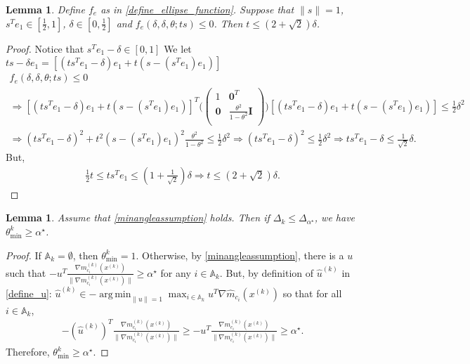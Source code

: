 \documentclass{article}
\newtheorem{lemma}[theorem]{Lemma}
\theoremstyle{case}
\DeclareMathOperator*{\argmin}{arg\,min}
\newcommand{\xk}{{x^{(k)}}}
\newcommand{\dk}{\Delta_k}
\newcommand{\huk}{{{\hat u}^{(k)}}}
\newcommand{\gmcik}{{\nabla m_{c_i}^{(k)}(\xk)}}
\newcommand{\hgmcik}{{\nabla \hat m_{c_i}(\xk)}}
\newcommand{\minangledelta}{{\Delta_{\alpha^{\star}}}}
\newcommand{\minanglealpha}{{ \alpha^{\star} }}
\newcommand{\activeconstraintsk}{{\mathbb A_{k}}}
\newcommand{\thetamink}{{\theta^k_{\text{min}}}}
\begin{document}
\begin{lemma}
\label{ellipse_fits_part_2}
Define $f_e$ as in \cref{define_ellipse_function}.
Suppose that $\|s\| = 1$, $s^Te_1 \in \left[\frac 1 2, 1\right]$, $\delta \in [0, \frac 1 2]$ and $f_e(\delta, \delta, \theta; ts) \le 0$.
Then $t \le \left(2 + \sqrt{2}\right) \delta$.
\end{lemma}
\begin{proof}
Notice that $s^Te_1 - \delta \in \left[0, 1\right]$
We let $ts - \delta e_1= \left[\left(ts^Te_1 - \delta\right) e_1 + t\left(s - \left(s^Te_1\right) e_1\right)\right]$
\begin{align*}
f_e(\delta, \delta, \theta; ts) \le 0 \\
\Longrightarrow 
\left[\left(ts^Te_1 - \delta\right) e_1 + t\left(s - \left(s^Te_1\right) e_1\right)\right]^T\bigg(\begin{pmatrix}
1 & \boldsymbol0^T \\
\boldsymbol 0 & \frac{\theta^2}{1 - \theta^2} \boldsymbol I \\
\end{pmatrix}\bigg)\left[\left(ts^Te_1 - \delta\right) e_1 + t\left(s - \left(s^Te_1\right) e_1\right)\right] \le \frac 1 2 \delta^2 \\
\Longrightarrow
\left(ts^Te_1 - \delta\right)^2 + t^2\left(s - \left(s^Te_1\right) e_1\right)^2  \frac{\theta^2}{1 - \theta^2} \le \frac 1 2 \delta^2
\Longrightarrow 
\left(t s^Te_1 - \delta\right)^2 \le \frac 1 2 \delta^2 
\Longrightarrow t s^Te_1 - \delta \le \frac 1 {\sqrt{2}} \delta.
\end{align*}
But,
\begin{align*}
\frac 1 2 t \le t s^Te_1 \le \left(1 + \frac 1 {\sqrt{2}}\right) \delta
\Longrightarrow t \le \left(2 + \sqrt{2}\right) \delta.
\end{align*}
\end{proof}

\begin{lemma}
\label{theta_min_is_bounded}
Assume that \cref{minangleassumption} holds.
Then if $\dk \le \minangledelta$, we have $\thetamink \ge \minanglealpha$.
\end{lemma}

\begin{proof}
If $\activeconstraintsk = \emptyset$, then $\thetamink = 1$.
Otherwise, by \cref{minangleassumption}, there is a $u$ such that 
$-u^T\frac{\gmcik}{\|\gmcik\|} \ge \minanglealpha$ for any $i \in \activeconstraintsk$.
But, by definition of $\huk$ in \cref{define_u}:
$\huk \in -\argmin_{\|u\| = 1} \max_{i \in \activeconstraintsk} u^T\hgmcik$
so that for all $i \in \activeconstraintsk$,
\begin{align*}
-\left(\huk\right)^T\frac{\gmcik}{\|\gmcik\|}  \ge -u^T\frac{\gmcik}{\|\gmcik\|} \ge \minanglealpha.
\end{align*}
Therefore, $\thetamink \ge \minanglealpha$.
\end{proof}
\end{document}
